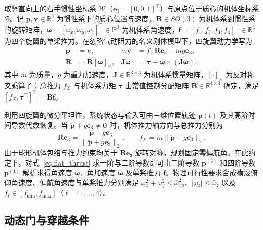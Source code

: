 \documentclass[journal]{IEEEtran}
\begin{document}
取竖直向上的右手惯性坐标系 $\mathcal{W}$（$\mathbf{e}_3 = [0, 0, 1]^\top$）与原点位于质心的机体坐标系 $\mathcal{B}$。记 $\mathbf{p}, \mathbf{v} \in \mathbb{R}^3$ 为惯性系下的质心位置与速度，$\mathbf{R} \in SO(3)$ 为机体系到惯性系的旋转矩阵，$\boldsymbol{\omega} = [\omega_x, \omega_y, \omega_z]^\top \in \mathbb{R}^3$ 为机体系角速度，$\mathbf{f} = [f_1, f_2, f_3, f_4]^\top \in \mathbb{R}^4$ 为四个旋翼的单桨推力。在忽略气动阻力的名义刚体模型下，四旋翼动力学写为
\begin{equation}
\begin{aligned}
\dot{\mathbf{p}} &= \mathbf{v}, &
m\dot{\mathbf{v}} &= f_\Sigma \mathbf{R}\mathbf{e}_3 - m g \mathbf{e}_3, \\
\dot{\mathbf{R}} &= \mathbf{R}[\boldsymbol{\omega}]_\times, &
\mathbf{J}\dot{\boldsymbol{\omega}} &= \boldsymbol{\tau} - \boldsymbol{\omega} \times (\mathbf{J}\boldsymbol{\omega}),
\end{aligned}
\label{eq:quad_dynamics}
\end{equation}
其中 $m$ 为质量，$g$ 为重力加速度，$\mathbf{J} \in \mathbb{R}^{3 \times 3}$ 为机体系惯量矩阵，$[\cdot]_\times$ 为反对称叉乘算子；总推力 $f_\Sigma$ 与机体系力矩 $\boldsymbol{\tau}$ 由常值控制分配矩阵 $\mathbf{B} \in \mathbb{R}^{4 \times 4}$ 确定，满足 $[f_\Sigma, \boldsymbol{\tau}^\top]^\top = \mathbf{B}\mathbf{f}$。

利用四旋翼的微分平坦性，系统状态与输入可由三维位置轨迹 $\mathbf{p}(t)$ 及其高阶时间导数代数恢复。当 $\ddot{\mathbf{p}} + g\mathbf{e}_3 \neq \mathbf{0}$ 时，机体推力轴方向与总推力分别为
\begin{equation}
\mathbf{R}\mathbf{e}_3 = \frac{\ddot{\mathbf{p}} + g\mathbf{e}_3}{\|\ddot{\mathbf{p}} + g\mathbf{e}_3\|_2}, \qquad
f_\Sigma = m\|\ddot{\mathbf{p}} + g\mathbf{e}_3\|_2.
\label{eq:flat_thrust}
\end{equation}
由于球形机体包络与推力约束均关于 $\mathbf{R}\mathbf{e}_3$ 旋转对称，规划固定零偏航角。在此约定下，对式~\eqref{eq:flat_thrust} 求一阶与二阶导数即可由三阶导数 $\mathbf{p}^{(3)}$ 和四阶导数 $\mathbf{p}^{(4)}$ 解析求得角速度 $\boldsymbol{\omega}$、角加速度 $\dot{\boldsymbol{\omega}}$ 及单桨推力 $\mathbf{f}$。物理可行性要求合成横滚俯仰角速度、偏航角速度与单桨推力分别满足 $\omega_x^2 + \omega_y^2 \le \bar{\omega}_{xy}^2$、$|\omega_z| \le \bar{\omega}_z$ 以及 $f_\ell \in [f_{\min}, f_{\max}]$（$\ell = 1, \ldots, 4$）。

\subsection{动态门与穿越条件}
\end{document}
